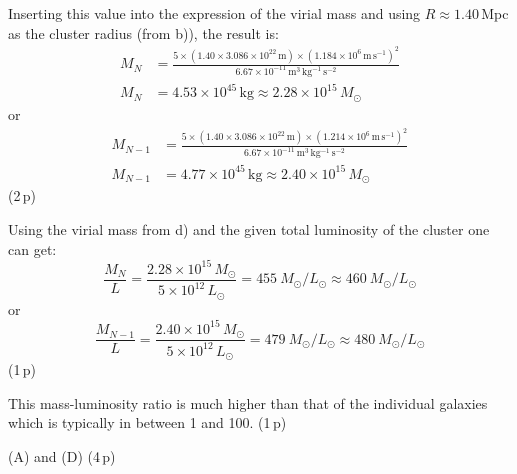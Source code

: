 \begin{description}
  Inserting this value into the expression of the virial mass and using
  $R \approx 1.40$\,Mpc as the cluster radius (from b)), the result is:
  \begin{align*}
  M_N &= \frac{5\times(1.40\times 3.086\times 10^{22}\,\mathrm{m})
    \times(1.184\times 10^{6}\,\mathrm{m\,s^{-1}})^2}
    {6.67\times 10^{-11}\,\mathrm{m^3\,kg^{-1}\,s^{-2}}}\\
  M_N &= 4.53\times 10^{45}\,\mathrm{kg}
    \approx 2.28\times 10^{15}\,M_\odot
  \end{align*}
  or
  \begin{align*}
  M_{N-1} &= \frac{5\times(1.40\times 3.086\times 10^{22}\,\mathrm{m})
    \times(1.214\times 10^{6}\,\mathrm{m\,s^{-1}})^2}
    {6.67\times 10^{-11}\,\mathrm{m^3\,kg^{-1}\,s^{-2}}}\\
  M_{N-1} &= 4.77\times 10^{45}\,\mathrm{kg}
    \approx 2.40\times 10^{15}\,M_\odot
  \end{align*}
  \hfill(2\,p)

\item[e)] Using the virial mass from d) and the given total luminosity of
  the cluster one can get:
  \[ \frac{M_N}{L} = \frac{2.28\times 10^{15}\,M_\odot}
     {5\times 10^{12}\,L_\odot}
     = 455\ M_\odot/L_\odot \approx 460\ M_\odot/L_\odot \]
  or
  \[ \frac{M_{N-1}}{L} = \frac{2.40\times 10^{15}\,M_\odot}
     {5\times 10^{12}\,L_\odot}
     = 479\ M_\odot/L_\odot \approx 480\ M_\odot/L_\odot \]
  \hfill(1\,p)

  This mass-luminosity ratio is much higher than that of the individual
  galaxies which is typically in between 1 and 100. \hfill(1\,p)

\item[f)] (A) and (D) \hfill(4\,p)
\end{description}

